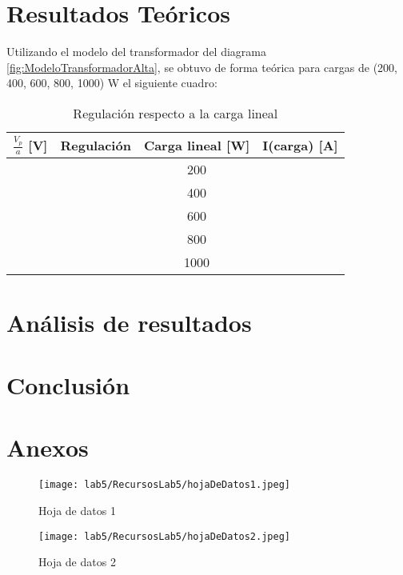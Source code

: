 \documentclass[11pt,letterpaper]{article}     %
\begin{document}
\section{Resultados Teóricos}
Utilizando el modelo del transformador del diagrama \ref{fig:ModeloTransformadorAlta}, se obtuvo de forma teórica para cargas de (200, 400, 600, 800, 1000) W el siguiente cuadro:
\begin{table}[H]
\centering
\caption{Regulación respecto a la carga lineal}
\label{RegcuadroTEORICO}
\begin{tabular}{|c|c|c|c|}
\hline
\textbf{$\frac{V_{p}}{a}$ {[}V{]}} & \textbf{Regulación} & \textbf{Carga lineal {[}W{]}}  & \textbf{I(carga) {[}A{]}} \\ \hline
                                   &                     & 200    &             \\ \hline
                                   &                     & 400    &             \\ \hline
                                   &                     & 600      &              \\ \hline
                                   &                     & 800    &                \\ \hline
                                   &                     & 1000   &                \\ \hline
\end{tabular}
\end{table}
\section{Análisis de resultados}
\section{Conclusión}
\newpage
\section{Anexos}
\begin{figure}[H]
    \centering
    \texttt{[image: lab5/RecursosLab5/hojaDeDatos1.jpeg]}
    \caption{Hoja de datos 1}
\end{figure}
\begin{figure}[H]
    \centering
    \texttt{[image: lab5/RecursosLab5/hojaDeDatos2.jpeg]}
    \caption{Hoja de datos 2}
\end{figure}
\end{document}
